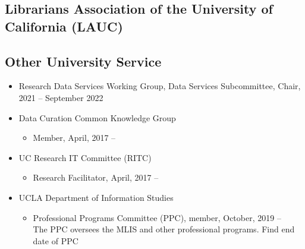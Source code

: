
\subsection{Librarians Association of the University of California (LAUC)}

\subsection{Other University Service}
\begin{itemize}[label={},leftmargin=!,labelindent=5pt,itemindent=-15pt]
  \item Research Data Services Working Group, Data Services Subcommittee, Chair,  2021 -- September 2022
  \item Data Curation Common Knowledge Group
  \begin{itemize}
    \item Member, April, 2017 --
  \end{itemize}
  \item UC Research IT Committee (RITC)
    \begin{itemize}[label={},leftmargin=!,labelindent=5pt,itemindent=-15pt]
      \item Research Facilitator, April, 2017 --
    \end{itemize}
  \item UCLA Department of Information Studies
    \begin{itemize}[label={},leftmargin=!,labelindent=5pt,itemindent=-15pt]
      \item Professional Programs Committee (PPC), member, October, 2019 --  \\ The PPC oversees the MLIS and other professional programs.
      \todo Find end date of PPC 
    \end{itemize}
\end{itemize}
